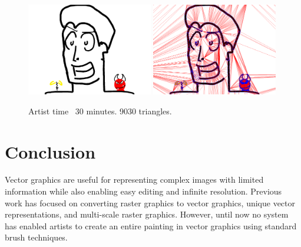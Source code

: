 \documentclass[conference]{acmsiggraph}
\begin{document}






\begin{figure}
    \centering
        \includegraphics[width=0.49\textwidth]{images/facezoom}
        \includegraphics[width=0.49\textwidth]{images/facezoomtriangles}
    \caption{Artist time ~30 minutes. 9030 triangles.}
\end{figure}



\section{Conclusion}
Vector graphics are useful for representing complex images with limited information
while also enabling easy editing and infinite resolution. Previous work has focused
on converting raster graphics to vector graphics, unique vector representations, and multi-scale
raster graphics. However, until now no system
has enabled artists to create an entire painting in vector graphics using standard brush techniques. 
\end{document}
